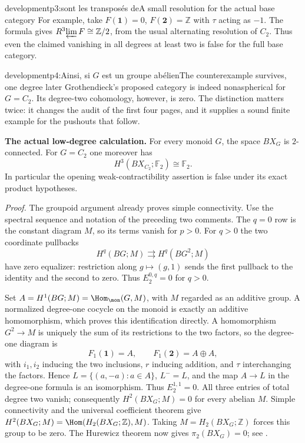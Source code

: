 \begin{dcomment}{development}{p3:sont les transposés de}{A small resolution for the actual base category}
For example, take $F(\mathbf1)=0$, $F(\mathbf2)=\mathbb Z$ with $\tau$ acting as $-1$. The formula gives $R^3\!\varprojlim F\cong\mathbb Z/2$, from the usual alternating resolution of $C_2$. Thus even the claimed vanishing in all degrees at least two is false for the full base category.
\end{dcomment}

\begin{dcomment}{development}{p4:Ainsi, si $G$ est un groupe abélien}{The counterexample survives, one degree later}
Grothendieck's proposed category is indeed nonaspherical for $G=C_2$. Its degree-two cohomology, however, is zero. The distinction matters twice: it changes the audit of the first four pages, and it supplies a sound finite example for the pushouts that follow.

\textbf{The actual low-degree calculation.}\ours
For every monoid $G$, the space $BX_G$ is $2$-connected. For $G=C_2$ one moreover has
\[
 H^3(BX_{C_2};\mathbb F_2)\cong\mathbb F_2.
\]
In particular the opening weak-contractibility assertion is false under its exact product hypotheses.

\emph{Proof.} The groupoid argument already proves simple connectivity. Use the spectral sequence and notation of the preceding two comments. The $q=0$ row is the constant diagram $M$, so its terms vanish for $p>0$. For $q>0$ the two coordinate pullbacks
\[
 H^q(BG;M)\rightrightarrows H^q(BG^2;M)
\]
have zero equalizer: restriction along $g\mapsto(g,1)$ sends the first pullback to the identity and the second to zero. Thus $E_2^{0,q}=0$ for $q>0$.

Set $A=H^1(BG;M)=\Hom_{\mon}(G,M)$, with $M$ regarded as an additive group. A normalized degree-one cocycle on the monoid is exactly an additive homomorphism, which proves this identification directly. A homomorphism $G^2\to M$ is uniquely the sum of its restrictions to the two factors, so the degree-one diagram is
\[
 F_1(\mathbf1)=A,\qquad F_1(\mathbf2)=A\oplus A,
\]
with $i_1,i_2$ inducing the two inclusions, $r$ inducing addition, and $\tau$ interchanging the factors. Hence $L=\{(a,-a):a\in A\}$, $L^-=L$, and the map $A\to L$ in the degree-one formula is an isomorphism. Thus $E_2^{1,1}=0$. All three entries of total degree two vanish; consequently $H^2(BX_G;M)=0$ for every abelian $M$. Simple connectivity and the universal coefficient theorem give $H^2(BX_G;M)=\Hom(H_2(BX_G;\mathbb Z),M)$. Taking $M=H_2(BX_G;\mathbb Z)$ forces this group to be zero. The Hurewicz theorem now gives $\pi_2(BX_G)=0$; see \citet[Theorems 3.2 and 4.32]{Hatcher2002}.


\end{dcomment}
